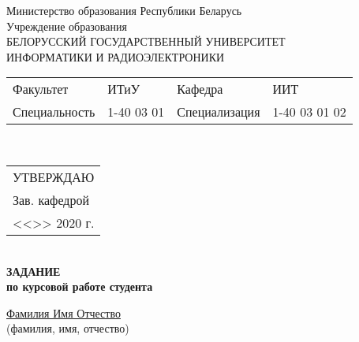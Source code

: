 {
  \thispagestyle{empty}
  \setlength{\parindent}{0em}

  \newcommand{\lineunderscore}{\uline{\hspace*{\fill}}}

  \begin{center}
    Министерство образования Республики Беларусь\\
    Учреждение образования\\
    БЕЛОРУССКИЙ ГОСУДАРСТВЕННЫЙ УНИВЕРСИТЕТ \\
    ИНФОРМАТИКИ И РАДИОЭЛЕКТРОНИКИ\\[1em]
  

  \begin{minipage}{\textwidth}
    \begin{flushleft}
      \begin{tabular}{ p{}p{}p{}p{} @{} }
        Факультет & ИТиУ & Кафедра & ИИТ \\
        Специальность   & 1-40 03 01 & Специализация & 1-40 03 01 02
      \end{tabular}
    \end{flushleft}
  \end{minipage}\\[1em]

  \begin{minipage}{\textwidth}
    \begin{flushright}
      \begin{tabular}{p{}}
        УТВЕРЖДАЮ \\[0.5em]
        \underline{\hspace*{6em}} Зав. кафедрой \\
        
        <<\underline{\hspace*{4ex}}>> \underline{\hspace*{7em}} 2020 г.
      \end{tabular}
    \end{flushright}
  \end{minipage}\\[1em]

  \textbf{ЗАДАНИЕ} \\
  \textbf{по курсовой работе студента}

  \lineunderscore\uline{Фамилия Имя Отчество}\lineunderscore \\
  {\small (фамилия, имя, отчество) }


\end{center}}
